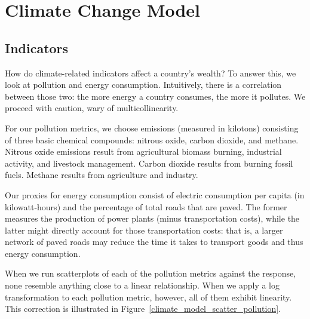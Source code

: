 \documentclass[11pt]{article}
\begin{document}









\section{Climate Change Model}
\label{sec:model_climate}

\subsection{Indicators}
How do climate-related indicators affect a country's wealth? To answer this, we look at pollution and energy consumption. Intuitively, there is a correlation between those two: the more energy a country consumes, the more it pollutes. We proceed with caution, wary of multicollinearity.

For our pollution metrics, we choose emissions (measured in kilotons) consisting of three basic chemical compounds: nitrous oxide, carbon dioxide, and methane. Nitrous oxide emissions result from agricultural biomass burning, industrial activity, and livestock management. Carbon dioxide results from burning fossil fuels. Methane results from agriculture and industry.

Our proxies for energy consumption consist of electric consumption per capita (in kilowatt-hours) and the percentage of total roads that are paved. The former measures the production of power plants (minus transportation costs), while the latter might directly account for those transportation costs: that is, a larger network of paved roads may reduce the time it takes to transport goods and thus energy consumption.

When we run scatterplots of each of the pollution metrics against the response, none resemble anything close to a linear relationship. When we apply a log transformation to each pollution metric, however, all of them exhibit linearity. This correction is illustrated in Figure~\ref{climate_model_scatter_pollution}.
\end{document}
